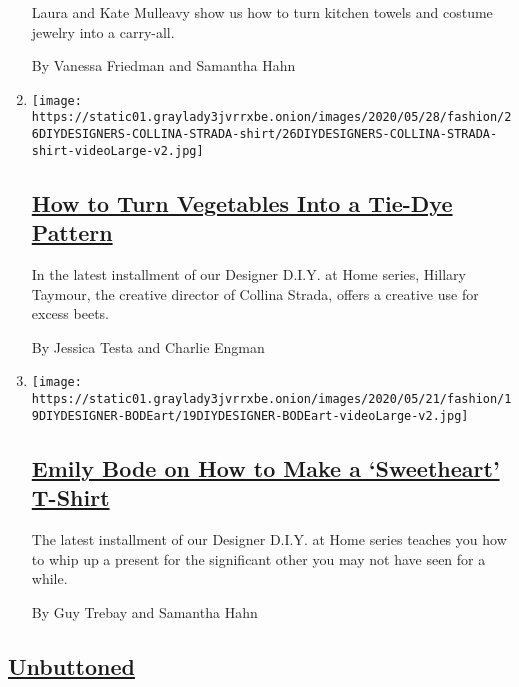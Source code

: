 \begin{enumerate}
  Laura and Kate Mulleavy show us how to turn kitchen towels and costume
  jewelry into a carry-all.

  By Vanessa Friedman and Samantha Hahn
\item
  \texttt{[image: https://static01.graylady3jvrrxbe.onion/images/2020/05/28/fashion/26DIYDESIGNERS-COLLINA-STRADA-shirt/26DIYDESIGNERS-COLLINA-STRADA-shirt-videoLarge-v2.jpg]}

  \hypertarget{how-to-turn-vegetables-into-a-tie-dye-pattern}{%
  \subsection{\texorpdfstring{\href{/2020/05/27/style/tie-dye-plaid-with-collina-strada.html}{How
  to Turn Vegetables Into a Tie-Dye
  Pattern}}{How to Turn Vegetables Into a Tie-Dye Pattern}}\label{how-to-turn-vegetables-into-a-tie-dye-pattern}}

  In the latest installment of our Designer D.I.Y. at Home series,
  Hillary Taymour, the creative director of Collina Strada, offers a
  creative use for excess beets.

  By Jessica Testa and Charlie Engman
\item
  \texttt{[image: https://static01.graylady3jvrrxbe.onion/images/2020/05/21/fashion/19DIYDESIGNER-BODEart/19DIYDESIGNER-BODEart-videoLarge-v2.jpg]}

  \hypertarget{emily-bode-on-how-to-make-a-sweetheart-t-shirt}{%
  \subsection{\texorpdfstring{\href{/2020/05/19/style/emily-bode-sweetheart-t-shirt.html}{Emily
  Bode on How to Make a `Sweetheart'
  T-Shirt}}{Emily Bode on How to Make a `Sweetheart' T-Shirt}}\label{emily-bode-on-how-to-make-a-sweetheart-t-shirt}}

  The latest installment of our Designer D.I.Y. at Home series teaches
  you how to whip up a present for the significant other you may not
  have seen for a while.

  By Guy Trebay and Samantha Hahn
\end{enumerate}

\hypertarget{unbuttoned-1}{%
\subsection{\texorpdfstring{\href{/column/unbuttoned}{Unbuttoned}}{Unbuttoned}}\label{unbuttoned-1}}

